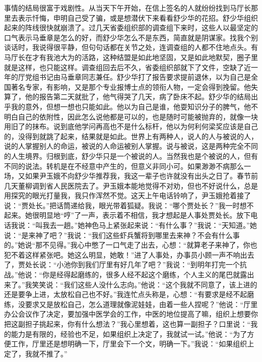 \documentclass[12pt,oneside]{book}
\begin{document}
事情的结局很富于戏剧性。从当天下午开始，在信上签名的人就纷纷找到马厅长那里去表示忏悔，申明自己受了骗，或是想潜伏下来看看舒少华的花招。舒少华组织起来的阵线很快就崩溃了。过几天省委组织部的调查组下来时，这些人以最坚定的口气表示马垂章是怎么的好，而舒少华怎么不是东西，简直就是阴谋家。找我个别谈话时，我说得很平静，但句句话都在关节之处，连调查组的人都不住地点头。有马厅长在才有我池大为的活路，这种结盟是如此地坚固，又是如此地默契，圈子里就是这样，也只能这样。调查组回去后不久，省委组织部就下了文件，空缺了近一年的厅党组书记由马垂章同志兼任。舒少华打了报告要求提前退休，以为自己是全国著名专家，有影响，又是那个专业报博士点的领衔人物，一定会得到挽留。他失算了，他的报告第二天就批了，他气得哭了几天，病了卧床不起。舒少华的结局出乎我的意外，但想一想也只能如此。他以为自己是谁，他耍知识分子的脾气，他不明白自己的依附性，因此怎么说他都是可以的，也是随时可能被抛弃的，就像一块用旧了的抹布。说到底他学问再高也不是什么标杆，他以为何利何梁奖应该是自己的，没得到就跳了起来，结果就是如此。世界上有两种人，说人的人与被说的人，说的人掌握别人的命运，被说的人命运被别人掌握。说与被说，这是两种完全不同的人生境界。归根到底，舒少华只是一个被说的人。当然我也是个被说的人，但有不同的说法。转机是在不经意中产生的，但意义非同小可。如果渺渺不病那么一场，又如果尹玉娥不向舒少华推荐我，我这一辈子也许就没有出头之日了。春节前几天董柳调到省人民医院去了。尹玉娥本能地觉得不对劝，但也不好说什么，总是用探究的眼光打量我，我只作浑然不觉。这天上午电话铃响了，尹玉娥抢着接了说：``贾处长。''把话筒递给我，眼光带着狐疑。我说：``哪个贾处长？''我一时想不起来。她很明显地``哼''了一声，表示着不相信，我才想起是人事处贾处长。放下电话我说：``叫我去一趟。''她神色马上紧张起来说：``有什么事？''我说：``天知道。''她说：``是来神了吧？''我说：``我们这些虾兵蟹将到哪里去来神？不会有什么事的。''她说``那不见得。''我心中憋了一口气走了出去，心想：``就算老子来神了，你也犯不着这样紧张吧。她这么明显，她敢！''进了人事处，办事员小顾一声不响出去了，贾处长说：``小池你到我们厅里有好几年了吧？''我说：``到明年打完一个抗战。''他说：``你是经得起磨练的，很多人经不起这个磨练，个人主义的尾巴就露出来了。''我笑笑说：``我们这些人没什么志向。''他说：``这个我就不同意了，该上进的还是要争上进，太放松自己也不好。''我连忙点头称是，心想：``有要求是经不起磨练，没要求又是放松自己，怎么道理就像泥娃娃，由着一些人捏呢？''他说：``厅里办公会议作了决定，要加强中医学会的工作，中医的地位提高了嘛，组织上想要你把这副担子挑起来，你有什么想法？''我心里想着，这也算一副担子？口里说：``我的能力是有限的，经验也不足，如果组织上决定了，我就试一试。''他说：``为了方便工作，厅里还是想明确一下，厅里会下一个文，明确一下。''我说：``如果组织上定了，我就不推了。''
\end{document}
